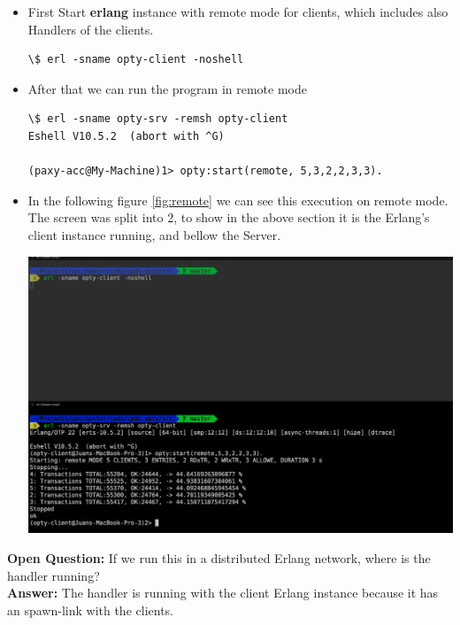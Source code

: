 \documentclass[a4paper, 10pt]{article}
\begin{document}
\begin{itemize}
\item First Start \textbf{erlang} instance with remote mode for clients, which
  includes also Handlers of the clients.

\begin{lstlisting}
\$ erl -sname opty-client -noshell
\end{lstlisting}

\item After that we can run the program in remote mode

\begin{lstlisting}
\$ erl -sname opty-srv -remsh opty-client
Eshell V10.5.2  (abort with ^G)

(paxy-acc@My-Machine)1> opty:start(remote, 5,3,2,2,3,3).
\end{lstlisting}

\item In the following figure \ref{fig:remote} we can see this execution on remote mode. The
  screen was split into 2, to show in the above section it is the Erlang's client
  instance running, and bellow the Server.

  \begin{minipage}[t]{\linewidth}
    \includegraphics[width=\textwidth]{remote}
    \label{fig:remote}
  \end{minipage}

\end{itemize}

\textbf{Open Question: } If we run this in a distributed Erlang network, where
  is the handler running?\\
\textbf{Answer: } The handler is running with the client Erlang instance because
it has an spawn-link with the clients.
\end{document}
